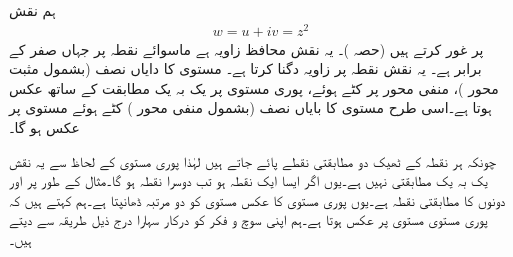 ہم نقش 
\begin{align}
w=u+iv=z^2
\end{align}
پر غور کرتے ہیں (حصہ )۔ یہ نقش محافظ زاویہ ہے ماسوائے نقطہ  پر جہاں  صفر کے برابر ہے۔ یہ نقش نقطہ  پر  زاویہ دگنا کرتا ہے۔ مستوی کا دایاں نصف (بشمول مثبت محور )، منفی محور   پر کٹے ہوئے،  پوری   مستوی پر یک بہ یک مطابقت کے ساتھ عکس ہوتا ہے۔اسی طرح  مستوی کا بایاں نصف (بشمول منفی محور ) کٹے ہوئے  مستوی پر عکس ہو گا۔

چونکہ ہر  نقطہ کے ٹھیک دو مطابقتی  نقطے پائے جاتے ہیں لہٰذا  پوری  مستوی کے لحاظ سے یہ نقش یک بہ یک مطابقتی نہیں ہے۔یوں اگر  ایسا ایک  نقطہ  ہو تب دوسرا نقطہ  ہو گا۔مثال کے طور پر  اور  دونوں کا مطابقتی نقطہ  ہے۔یوں پوری  مستوی کا عکس  مستوی کو دو مرتبہ ڈھانپتا ہے۔ہم کہتے ہیں کہ پوری  مستوی   مستوی پر عکس ہوتا ہے۔ہم اپنی سوچ و فکر کو درکار سہارا درج ذیل طریقہ سے دیتے ہیں۔

